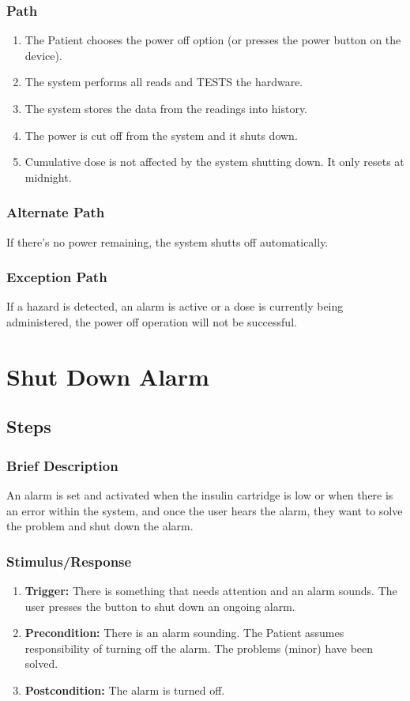 \documentclass{scrreprt}
\begin{document}
    \subsubsection{Path}
    \begin{enumerate}
        \item The Patient chooses the power off option (or presses the power button on the device).
        \item The system performs all reads and TESTS the hardware.
        \item The system stores the data from the readings into history.
        \item The power is cut off from the system and it shuts down.
        \item Cumulative dose is not affected by the system shutting down. It only resets at midnight.
    \end{enumerate}
    \subsubsection{Alternate Path}
        If there's no power remaining, the system shutts off automatically.
    \subsubsection{Exception Path}
         If a hazard is detected, an alarm is active or a dose is currently being administered, the power off operation will not be successful.

\section{Shut Down Alarm}
\subsection{Steps}
    \subsubsection{Brief Description}
        An alarm is set and activated when the insulin cartridge is low or when there is an error within the system, and once the user hears the alarm, they want to solve the problem and shut down the alarm.
    \subsubsection{Stimulus/Response}
    \begin{enumerate}
        \item \textbf{Trigger:} There is something that needs attention and an alarm sounds. The user presses the button to shut down an ongoing alarm. 
        \item \textbf{Precondition:} There is an alarm sounding. The Patient assumes responsibility of turning off the alarm. The problems (minor) have been solved.
        \item \textbf{Postcondition:} The alarm is turned off.
    \end{enumerate}
\end{document}
